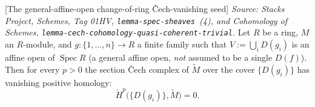 \begin{lemma}

[The general-affine-open change-of-ring {\v C}ech-vanishing seed]
  \label{lem:affine_cech_vanishing_general_seed}
  \textit{Source: Stacks Project, Schemes, Tag 01HV, \texttt{lemma-spec-sheaves}~(4), and
  Cohomology of Schemes, \texttt{lemma-cech-cohomology-quasi-coherent-trivial}.}
  Let \(R\) be a ring, \(M\) an \(R\)-module, and \(g : \{1, \dots, n\} \to R\) a finite family such that
  \(V := \bigcup_i D(g_i)\) is an affine open of \(\operatorname{Spec} R\) (a general affine open, \emph{not}
  assumed to be a single \(D(f)\)). Then for every \(p > 0\) the section {\v C}ech complex of
  \(\widetilde{M}\) over the cover \(\{D(g_i)\}\) has vanishing positive homology:
  \[
    \check{H}^p\bigl(\{D(g_i)\}, \widetilde{M}\bigr) = 0.
  \]
\end{lemma}
